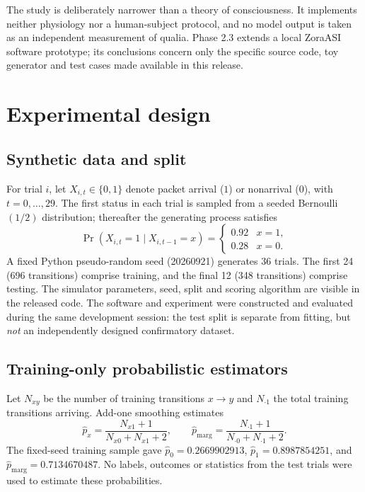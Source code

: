 \documentclass[11pt,a4paper]{article}
\begin{document}
The study is deliberately narrower than a theory of consciousness. It implements neither physiology nor a human-subject protocol, and no model output is taken as an independent measurement of qualia. Phase 2.3 extends a local ZoraASI software prototype; its conclusions concern only the specific source code, toy generator and test cases made available in this release.

\section{Experimental design}
\subsection{Synthetic data and split}
For trial $i$, let $X_{i,t}\in\{0,1\}$ denote packet arrival ($1$) or nonarrival ($0$), with $t=0,\ldots,29$. The first status in each trial is sampled from a seeded Bernoulli$(1/2)$ distribution; thereafter the generating process satisfies
\begin{equation}\label{eq:generator}
\Pr(X_{i,t}=1\mid X_{i,t-1}=x)=\begin{cases}0.92&x=1,\\0.28&x=0.\end{cases}
\end{equation}
A fixed Python pseudo-random seed (20260921) generates 36 trials. The first 24 (696 transitions) comprise training, and the final 12 (348 transitions) comprise testing. The simulator parameters, seed, split and scoring algorithm are visible in the released code. The software and experiment were constructed and evaluated during the same development session: the test split is separate from fitting, but \emph{not} an independently designed confirmatory dataset.

\subsection{Training-only probabilistic estimators}
Let $N_{xy}$ be the number of training transitions $x\to y$ and $N_{\cdot 1}$ the total training transitions arriving. Add-one smoothing estimates
\begin{equation}\label{eq:fit}
\widehat p_x=\frac{N_{x1}+1}{N_{x0}+N_{x1}+2},\qquad
\widehat p_{\mathrm{marg}}=\frac{N_{\cdot1}+1}{N_{\cdot0}+N_{\cdot1}+2}.
\end{equation}
The fixed-seed training sample gave $\widehat p_0=0.2669902913$, $\widehat p_1=0.8987854251$, and $\widehat p_{\mathrm{marg}}=0.7134670487$. No labels, outcomes or statistics from the test trials were used to estimate these probabilities.
\end{document}
